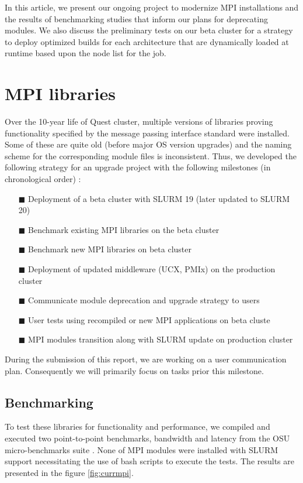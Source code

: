 \documentclass[sigconf,authordraft]{acmart}
\begin{document}
In this article, we present our ongoing project to modernize MPI installations and the results of benchmarking studies that inform our plans for deprecating modules. We also discuss the preliminary tests on our beta cluster for a strategy to deploy optimized builds for each architecture that are dynamically loaded at runtime based upon the node list for the job.

\section{MPI libraries}
Over the 10-year life of Quest cluster, multiple versions of libraries proving functionality specified by the message passing interface standard \cite{mpi_3_1,mpi_2_2} were installed. Some of these are quite old (before major OS version upgrades) and the naming scheme for the corresponding module files is inconsistent. Thus, we developed the following strategy for an upgrade project
with the following milestones (in chronological order) :
\begin{itemize}
	\item[$\blacksquare$] Deployment of a beta cluster with SLURM 19 (later updated to SLURM 20)
	\item[$\blacksquare$] Benchmark existing MPI libraries on the beta cluster
	\item[$\blacksquare$] Benchmark new MPI libraries on beta cluster
	\item[$\blacksquare$] Deployment of updated middleware (UCX, PMIx) on the production cluster
	\item[$\blacksquare$] Communicate module deprecation and upgrade strategy to users
	\item[$\blacksquare$] User tests using recompiled or new MPI applications on beta cluste
	\item[$\blacksquare$] MPI modules transition along with SLURM update on production cluster
\end{itemize}

During the submission of this report, we are working on a user communication plan. Consequently we will primarily focus on tasks prior this milestone.

\subsection{Benchmarking}

To test these libraries for functionality and performance, we compiled and executed two point-to-point benchmarks, bandwidth and latency from the OSU micro-benchmarks suite \cite{osu_bench_website}. None of MPI modules were installed with SLURM support necessitating the use of bash scripts to execute the tests. The results are presented in the figure \ref{fig:currmpi}.
\end{document}

